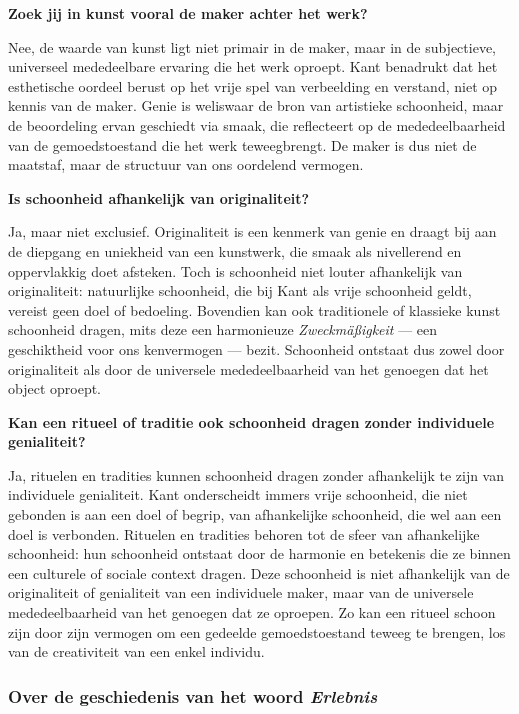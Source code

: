 \documentclass[11pt,twoside,openright]{memoir}
\begin{document}
\bigskip
\noindent
\textbf{Zoek jij in kunst vooral de maker achter het werk?}
\medskip

Nee, de waarde van kunst ligt niet primair in de maker, maar in de subjectieve, universeel mededeelbare ervaring die het werk oproept. Kant benadrukt dat het esthetische oordeel berust op het vrije spel van verbeelding en verstand, niet op kennis van de maker. Genie is weliswaar de bron van artistieke schoonheid, maar de beoordeling ervan geschiedt via smaak, die reflecteert op de mededeelbaarheid van de gemoedstoestand die het werk teweegbrengt. De maker is dus niet de maatstaf, maar de structuur van ons oordelend vermogen.

\bigskip
\noindent
\textbf{Is schoonheid afhankelijk van originaliteit?}
\medskip

Ja, maar niet exclusief. Originaliteit is een kenmerk van genie en draagt bij aan de diepgang en uniekheid van een kunstwerk, die smaak als nivellerend en oppervlakkig doet afsteken. Toch is schoonheid niet louter afhankelijk van originaliteit: natuurlijke schoonheid, die bij Kant als vrije schoonheid geldt, vereist geen doel of bedoeling. Bovendien kan ook traditionele of klassieke kunst schoonheid dragen, mits deze een harmonieuze \textit{Zweckmäßigkeit} — een geschiktheid voor ons kenvermogen — bezit. Schoonheid ontstaat dus zowel door originaliteit als door de universele mededeelbaarheid van het genoegen dat het object oproept.

\bigskip
\noindent
\textbf{Kan een ritueel of traditie ook schoonheid dragen zonder individuele genialiteit?}
\medskip

Ja, rituelen en tradities kunnen schoonheid dragen zonder afhankelijk te zijn van individuele genialiteit. Kant onderscheidt immers vrije schoonheid, die niet gebonden is aan een doel of begrip, van afhankelijke schoonheid, die wel aan een doel is verbonden. Rituelen en tradities behoren tot de sfeer van afhankelijke schoonheid: hun schoonheid ontstaat door de harmonie en betekenis die ze binnen een culturele of sociale context dragen. Deze schoonheid is niet afhankelijk van de originaliteit of genialiteit van een individuele maker, maar van de universele mededeelbaarheid van het genoegen dat ze oproepen. Zo kan een ritueel schoon zijn door zijn vermogen om een gedeelde gemoedstoestand teweeg te brengen, los van de creativiteit van een enkel individu.

\subsubsection{Over de geschiedenis van het woord \textit{Erlebnis}}
\end{document}
